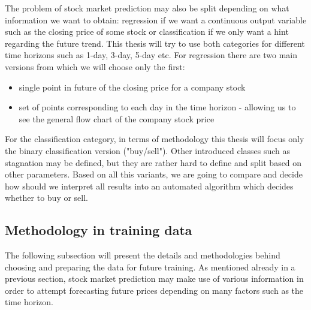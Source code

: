 The problem of stock market prediction may also be split depending on what information we want to obtain: regression if we want a continuous output variable such as the closing price of some stock or classification if we only want a hint regarding the future trend. This thesis will try to use both categories for different time horizons such as 1-day, 3-day, 5-day etc. For regression there are two main versions from which we will choose only the first:
\begin{itemize}
    \item single point in future of the closing price for a company stock
    \item set of points corresponding to each day in the time horizon - allowing us to see the general flow chart of the company stock price
\end{itemize}
For the classification category, in terms of methodology this thesis will focus only the binary classification version ("buy/sell"). Other introduced classes such as stagnation may be defined, but they are rather hard to define and split based on other parameters. Based on all this variants, we are going to compare and decide how should we interpret all results into an automated algorithm which decides whether to buy or sell.

\subsection{Methodology in training data}
The following subsection will present the details and methodologies behind choosing and preparing the data for future training. As mentioned already in a previous section, stock market prediction may make use of various information in order to attempt forecasting future prices depending on many factors such as the time horizon.

